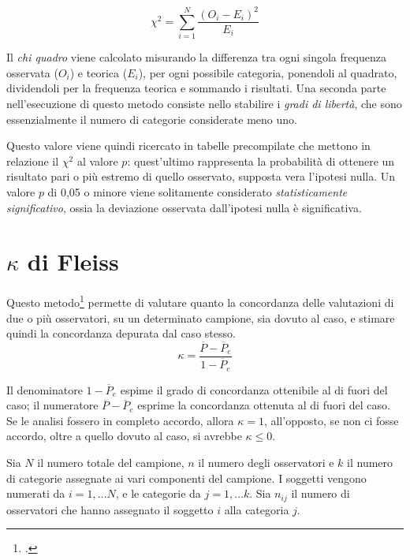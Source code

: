 \begin{equation}
\label{eq:chi_square}
\chi^2 = \sum_{i=1}^N \frac{{(O_i-E_i)}^2}{E_i}
\end{equation}

Il \emph{chi quadro} viene calcolato misurando la differenza tra ogni singola frequenza osservata ($O_i$) e teorica ($E_i$), per ogni possibile categoria, ponendoli al quadrato, dividendoli per la frequenza teorica e sommando i risultati. Una seconda parte nell'esecuzione di questo metodo consiste nello stabilire i \emph{gradi di libertà}, che sono essenzialmente il numero di categorie considerate meno uno.

Questo valore viene quindi ricercato in tabelle precompilate che mettono in relazione il $\chi^2$ al valore $p$: quest'ultimo rappresenta la probabilità di ottenere un risultato pari o più estremo di quello osservato, supposta vera l'ipotesi nulla. Un valore $p$ di 0,05 o minore viene solitamente considerato \emph{statisticamente significativo}, ossia la deviazione osservata dall'ipotesi nulla è significativa.

\section{$\kappa$ di Fleiss}
Questo metodo\footcite{Fleiss1971} permette di valutare quanto la concordanza delle valutazioni di due o più osservatori, su un determinato campione, sia dovuto al caso, e stimare quindi la concordanza depurata dal caso stesso.
\begin{equation}
\label{eq:kappa_fleiss}
\kappa = \frac{\overline{P} - \overline{P}_e}{1 - \overline{P}_e}
\end{equation}

Il denominatore $1 - \overline{P}_e$ espime il grado di concordanza ottenibile al di fuori del caso; il numeratore $\overline{P} - \overline{P}_e$ esprime la concordanza ottenuta al di fuori del caso. Se le analisi fossero in completo accordo, allora $\kappa = 1$, all'opposto, se non ci fosse accordo, oltre a quello dovuto al caso, si avrebbe $\kappa \leq 0$.

Sia $N$ il numero totale del campione, $n$ il numero degli osservatori e $k$ il numero di categorie assegnate ai vari componenti del campione. I soggetti vengono numerati da $i = 1, \ldots N$, e le categorie da $j = 1, \ldots k$. Sia $n_{ij}$ il numero di osservatori che hanno assegnato il soggetto $i$ alla categoria $j$.

